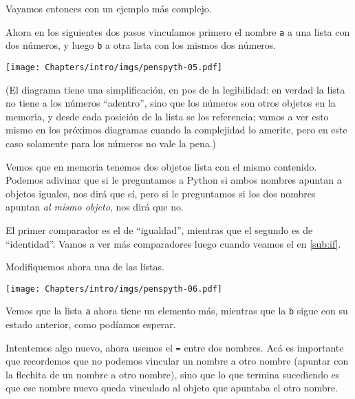 Vayamos entonces con un ejemplo más complejo. 

Ahora en los siguientes dos pasos vinculamos primero el nombre \verb|a| a una lista con dos números, y luego \verb|b| a otra lista con los mismos dos números.


\begin{center}
    \texttt{[image: Chapters/intro/imgs/penspyth-05.pdf]}
\end{center}

(El diagrama tiene una simplificación, en pos de la legibilidad: en verdad la lista no tiene a los números ``adentro'', sino que los números son otros objetos en la memoria, y desde cada posición de la lista se los referencia; vamos a ver esto mismo en los próximos diagramas cuando la complejidad lo amerite, pero en este caso solamente para los números no vale la pena.)

Vemos que en memoria tenemos dos objetos lista con el mismo contenido. Podemos adivinar que si le preguntamos a Python si ambos nombres apuntan a objetos iguales, nos dirá que sí, pero si le preguntamos si los dos nombres apuntan \textit{al mismo objeto}, nos dirá que no.


El primer comparador es el de ``igualdad'', mientras que el segundo es de ``identidad''. Vamos a ver más comparadores luego cuando veamos el  en \ref{sub:if}.

Modifiquemos ahora una de las listas.


\begin{center}
    \texttt{[image: Chapters/intro/imgs/penspyth-06.pdf]}
\end{center}

Vemos que la lista \verb|a| ahora tiene un elemento más, mientras que la \verb|b| sigue con su estado anterior, como podíamos esperar.

Intentemos algo nuevo, ahora usemos el \verb|=| entre dos nombres. Acá es importante que recordemos que no podemos vincular un nombre a otro nombre (apuntar con la flechita de un nombre a otro nombre), sino que lo que termina sucediendo es que ese nombre nuevo queda vinculado al objeto que apuntaba el otro nombre.

